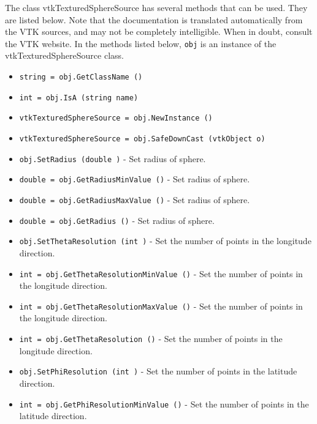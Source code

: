 The class vtkTexturedSphereSource has several methods that can be used.
  They are listed below.
Note that the documentation is translated automatically from the VTK sources,
and may not be completely intelligible.  When in doubt, consult the VTK website.
In the methods listed below, \verb|obj| is an instance of the vtkTexturedSphereSource class.
\begin{itemize}
\item  \verb|string = obj.GetClassName ()|

\item  \verb|int = obj.IsA (string name)|

\item  \verb|vtkTexturedSphereSource = obj.NewInstance ()|

\item  \verb|vtkTexturedSphereSource = obj.SafeDownCast (vtkObject o)|

\item  \verb|obj.SetRadius (double )| -  Set radius of sphere.

\item  \verb|double = obj.GetRadiusMinValue ()| -  Set radius of sphere.

\item  \verb|double = obj.GetRadiusMaxValue ()| -  Set radius of sphere.

\item  \verb|double = obj.GetRadius ()| -  Set radius of sphere.

\item  \verb|obj.SetThetaResolution (int )| -  Set the number of points in the longitude direction.

\item  \verb|int = obj.GetThetaResolutionMinValue ()| -  Set the number of points in the longitude direction.

\item  \verb|int = obj.GetThetaResolutionMaxValue ()| -  Set the number of points in the longitude direction.

\item  \verb|int = obj.GetThetaResolution ()| -  Set the number of points in the longitude direction.

\item  \verb|obj.SetPhiResolution (int )| -  Set the number of points in the latitude direction.

\item  \verb|int = obj.GetPhiResolutionMinValue ()| -  Set the number of points in the latitude direction.


\end{itemize}
